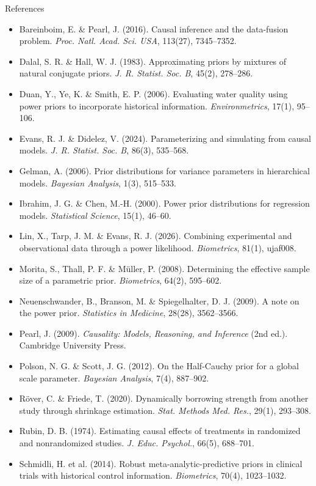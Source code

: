 \documentclass[t]{beamer}
\begin{document}
\begin{frame}{References}
    \vspace{-0.2cm}
    \begin{itemize}
        \tiny
        \setlength{\itemsep}{0.06cm}
        \item Bareinboim, E. \& Pearl, J. (2016). Causal inference and the data-fusion problem. \textit{Proc. Natl. Acad. Sci. USA}, 113(27), 7345--7352.
        \item Dalal, S. R. \& Hall, W. J. (1983). Approximating priors by mixtures of natural conjugate priors. \textit{J. R. Statist. Soc. B}, 45(2), 278--286.
        \item Duan, Y., Ye, K. \& Smith, E. P. (2006). Evaluating water quality using power priors to incorporate historical information. \textit{Environmetrics}, 17(1), 95--106.
        \item Evans, R. J. \& Didelez, V. (2024). Parameterizing and simulating from causal models. \textit{J. R. Statist. Soc. B}, 86(3), 535--568.
        \item Gelman, A. (2006). Prior distributions for variance parameters in hierarchical models. \textit{Bayesian Analysis}, 1(3), 515--533.
        \item Ibrahim, J. G. \& Chen, M.-H. (2000). Power prior distributions for regression models. \textit{Statistical Science}, 15(1), 46--60.
        \item Lin, X., Tarp, J. M. \& Evans, R. J. (2026). Combining experimental and observational data through a power likelihood. \textit{Biometrics}, 81(1), ujaf008.
        \item Morita, S., Thall, P. F. \& M{\"u}ller, P. (2008). Determining the effective sample size of a parametric prior. \textit{Biometrics}, 64(2), 595--602.
        \item Neuenschwander, B., Branson, M. \& Spiegelhalter, D. J. (2009). A note on the power prior. \textit{Statistics in Medicine}, 28(28), 3562--3566.
        \item Pearl, J. (2009). \textit{Causality: Models, Reasoning, and Inference} (2nd ed.). Cambridge University Press.
        \item Polson, N. G. \& Scott, J. G. (2012). On the Half-Cauchy prior for a global scale parameter. \textit{Bayesian Analysis}, 7(4), 887--902.
        \item R\"over, C. \& Friede, T. (2020). Dynamically borrowing strength from another study through shrinkage estimation. \textit{Stat. Methods Med. Res.}, 29(1), 293--308.
        \item Rubin, D. B. (1974). Estimating causal effects of treatments in randomized and nonrandomized studies. \textit{J. Educ. Psychol.}, 66(5), 688--701.
        \item Schmidli, H. et al. (2014). Robust meta-analytic-predictive priors in clinical trials with historical control information. \textit{Biometrics}, 70(4), 1023--1032.
    \end{itemize}
\end{frame}
\end{document}
